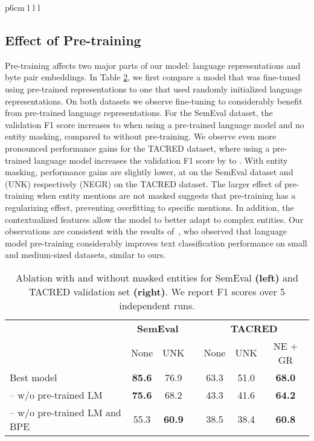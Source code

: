 \documentclass[akbc,twoside,11pt]{article}
\begin{document}
\begin{table}[ht!]
\begin{tabular}{p{6cm} l l l}
\subsection{Effect of Pre-training}
Pre-training affects two major parts of our model: language representations and byte pair embeddings. In Table \ref{tab:ablation_masking}, we first compare a model that was fine-tuned using pre-trained representations to one that used randomly initialized language representations. On both datasets we observe fine-tuning to considerably benefit from pre-trained language representations. For the SemEval dataset, the validation F1 score increases to  when using a pre-trained language model and no entity masking, compared to  without pre-training. We observe even more pronounced performance gains for the TACRED dataset, where using a pre-trained language model increases the validation F1 score by  to . With entity masking, performance gains are slightly lower, at  on the SemEval dataset and  (UNK) respectively  (NEGR) on the TACRED dataset. The larger effect of pre-training when entity mentions are not masked suggests that pre-training has a regularizing effect, preventing overfitting to specific mentions. In addition, the contextualized features allow the model to better adapt to complex entities. Our observations are consistent with the results of~\citet{ruder_universallm_2018}, who observed that language model pre-training considerably improves text classification performance on small and medium-sized datasets, similar to ours.

\begin{table}[ht!]
    \begin{center}
        \begin{tabular}{l@{\hskip .5in} c c c@{\hskip .3in} c c c}
            \hline
             & \multicolumn{2}{c}{\textbf{SemEval}} & & \multicolumn{3}{c}{\textbf{TACRED}} \\
& None & UNK & & None & UNK & NE + GR \\
            \hline
            Best model & \textbf{85.6} & 76.9 & & 63.3 & 51.0 & \textbf{68.0} \\
            -- w/o pre-trained LM & \textbf{75.6} & 68.2 & & 43.3 & 41.6 & \textbf{64.2} \\
            -- w/o pre-trained LM and BPE & 55.3 & \textbf{60.9} & & 38.5 & 38.4 & \textbf{60.8} \\
            \hline
        \end{tabular}
        \caption{Ablation with and without masked entities for SemEval \textbf{(left)} and TACRED validation set \textbf{(right)}. We report F1 scores over 5 independent runs.}
        \label{tab:ablation_masking}
    \end{center}
\end{table}


\end{tabular}
\end{table}
\end{document}
